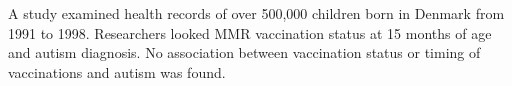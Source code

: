 \documentclass{article}
\begin{document}
\begin{flushleft}
\begin{enumalpha}
\item A study examined health records of over 500,000 children born in Denmark from 1991 to 1998. Researchers looked MMR vaccination status at 15 months of age and autism diagnosis. No association between vaccination status or timing of vaccinations and autism was found.\\ \medskip
{}

\end{enumalpha} 
\end{flushleft}
\end{document}
